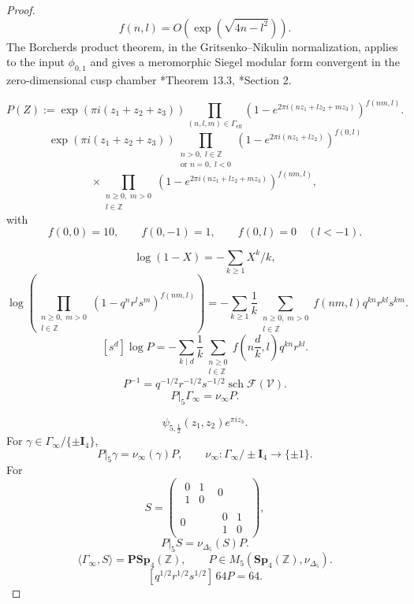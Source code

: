 \documentclass[11pt]{memoir}
\newcommand{\Z}{\mathbb{Z}} \newcommand{\C}{\mathbb{C}}
\newcommand{\Sp}{\mathbf{Sp}}
\newcommand{\PSp}{\mathbf{PSp}}
\newcommand{\Id}{\mathbf{I}}
\newcommand{\sch}{\operatorname{sch}}
\begin{document}
\begin{proof}
$$f(n,l)=O(\exp(\sqrt{4n-l^2})).$$
The Borcherds product theorem, in the Gritsenko--Nikulin normalization,
applies to the input $\phi_{0,1}$ and gives a meromorphic Siegel modular
form convergent in the zero-dimensional cusp chamber
\cite{B}*{Theorem 13.3}, \cite{GN}*{Section 2}.

$$P(Z):=\exp(\pi i(z_1 + z_2 + z_3))
\prod_{(n,l,m)\in\Gamma_{\mathrm{eff}}}
(1-e^{2\pi i(nz_1+lz_2+mz_3)})^{f(nm,l)}.$$
$$\exp(\pi i(z_1+z_2+z_3))
\prod_{\substack{n>0,\;l\in\Z\\\text{or }n=0,\;l<0}}
\left(1-e^{2\pi i(nz_1+lz_2)}\right)^{f(0,l)}$$
$$\times
\prod_{\substack{n\geq0,\;m>0\\l\in\Z}}
\left(1-e^{2\pi i(nz_1+lz_2+mz_3)}\right)^{f(nm,l)},$$
with
$$f(0,0)=10,\qquad f(0,-1)=1,\qquad f(0,l)=0\quad(l<-1).$$


$$\log(1-X)=-\sum_{k\geq1}X^k/k,$$
$$
\log\left(
\prod_{\substack{n\geq0,\;m>0\\l\in\Z}}
(1-q^nr^ls^m)^{f(nm,l)}
\right)
=-\sum_{k\geq1}\frac1k
\sum_{\substack{n\geq0,\;m>0\\l\in\Z}}
f(nm,l)q^{kn}r^{kl}s^{km}.
$$
$$[s^d]\log P
=-\sum_{k\mid d}\frac1k
\sum_{\substack{n\geq0\\l\in\Z}}
f\!\left(n\frac{d}{k},l\right)q^{kn}r^{kl}.$$
$$P^{-1}
=q^{-1/2}r^{-1/2}s^{-1/2}\sch\mathcal F(\mathcal V).$$
$$P|_5\Gamma_\infty=\nu_\infty P.$$

$$\psi_{5,\frac{1}{2}}(z_1,z_2)e^{\pi iz_3}.$$
For $\gamma\in\Gamma_{\infty}/\{\pm\Id_4\}$,
$$P|_5\gamma=\nu_{\infty}(\gamma)P,\qquad
\nu_{\infty}:\Gamma_{\infty} / \pm\Id_4 \rightarrow \{\pm 1\}.$$
For
$$S = \begin{pmatrix}\begin{matrix}0 & 1\\ 1 & 0\end{matrix} & 0\\ 0 &
\begin{matrix}0 & 1\\1 & 0\end{matrix}\end{pmatrix},$$
$$P|_5S=\nu_{\Delta_5}(S)P.$$
$$\langle \Gamma_\infty,S\rangle=\PSp_4(\Z),\qquad
P\in M_5(\Sp_4(\Z),\nu_{\Delta_5}).$$
$$[q^{1/2}r^{1/2}s^{1/2}]\,64P=64.$$


\end{proof}
\end{document}
